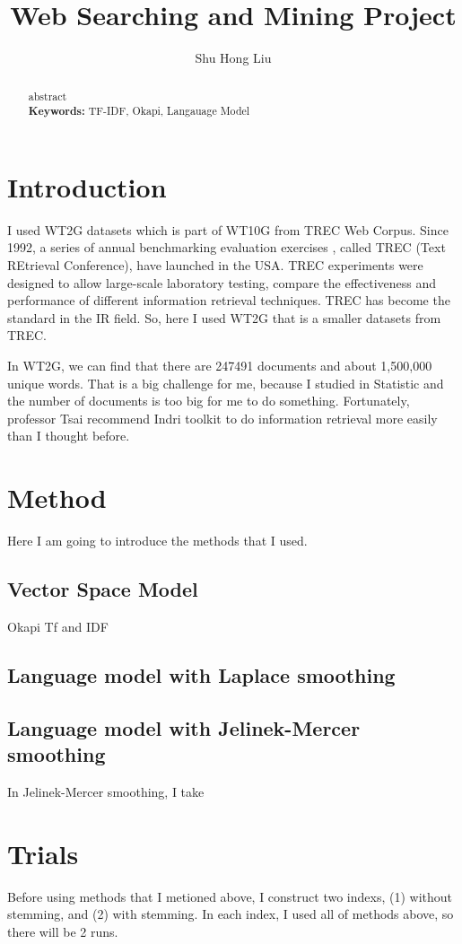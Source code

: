 \documentclass[a4pper,11pt,onecolumn]{article}
\title{Web Searching and Mining Project }
\author{Shu Hong Liu}
\begin{document}
\maketitle
\begin{abstract}
	abstract\\
{\bf Keywords:} TF-IDF, Okapi, Langauage Model
\end{abstract}
\section{Introduction}

I used WT2G datasets which is part of WT10G from TREC Web Corpus.
Since 1992, a series of annual benchmarking evaluation exercises , called TREC (Text REtrieval Conference), have launched in the USA. TREC experiments were designed to allow large-scale laboratory testing, compare the effectiveness and performance of different information retrieval techniques. TREC has become the standard in the IR field. So, here I used WT2G that is a smaller datasets from TREC.

In WT2G, we can find that there are 247491 documents and about 1,500,000 unique words. That is a big challenge for me, because I studied in Statistic and the number of documents is too big for me to do something. Fortunately, professor Tsai recommend Indri toolkit to do information retrieval more easily than I thought before.
\section{Method}
Here I am going to introduce the methods that I used.
\subsection{Vector Space Model}
Okapi Tf and IDF
\subsection{Language model with Laplace smoothing}

\subsection{Language model with Jelinek-Mercer smoothing}
In Jelinek-Mercer smoothing, I take 
\section{Trials}
Before using methods that I metioned above, I construct two indexs, (1) without stemming, and (2) with stemming. In each index, I used all of methods above, so there will be 2  runs.
\end{document}
